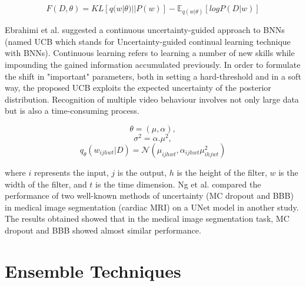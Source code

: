 \documentclass[journal]{IEEEtran}
\begin{document}
\begin{equation*}
    F(D,\theta) = KL[q(w|\theta)||P(w)] - \mathbb{E}_{q(w|\theta)}[logP(D|w)]
\end{equation*}

Ebrahimi et al. suggested a continuous uncertainty-guided approach to BNNs (named
UCB which stands for Uncertainty-guided continual learning technique with BNNs).
Continuous learning refers to learning a number of
new skills while impounding the gained information accumulated previously.
In order to formulate the shift in "important" parameters, both in setting a hard-threshold and
in a soft way, the proposed UCB exploits the expected uncertainty of the posterior distribution.
Recognition of multiple video behaviour involves not only
large data but is also a time-consuming process. \cite{kabir2018neural}

\begin{equation*}
    \theta = (\mu,\alpha),
\end{equation*}
\begin{equation*}
    \sigma^2 = \alpha.\mu^2,
\end{equation*}
\begin{equation*}
    q_\theta(w_{ijhwt}|D) = \mathcal{N}(\mu_{ijhwt},\alpha_{ijhwt}\mu^2_{ihjwt})
\end{equation*}

where $i$ represents the input, $j$ is the output, $h$ is the height of the
filter, $w$ is the width of the filter, and $t$ is the time dimension.
Ng et al. compared the performance of two well-known methods of uncertainty (MC dropout
and BBB) in medical image segmentation (cardiac MRI) on a UNet model in another study.
The results obtained showed that in the medical image
segmentation task, MC dropout and BBB showed almost similar performance. 


\section{Ensemble Techniques}
\end{document}
